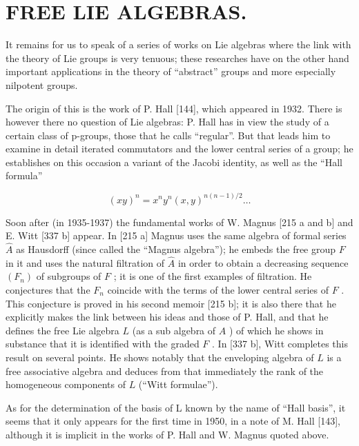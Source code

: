 \section{FREE LIE ALGEBRAS.}

It remains for us to speak of a series of works on Lie algebras where the link with the theory of Lie groups is very tenuous; these researches have on the other hand important applications in the theory of ``abstract'' groups and more especially nilpotent groups.

The origin of this is the work of P. Hall {[}144{]}, which appeared in 1932. There is however there no question of Lie algebras: P. Hall has in view the study of a certain class of p-groups, those that he calls ``regular''. But that leads him to examine in detail iterated commutators and the lower central series of a group; he establishes on this occasion a variant of the Jacobi identity, as well as the ``Hall formula''

\[
(x y) ^ {n} = x ^ {n} y ^ {n} (x, y) ^ {n (n - 1) / 2} \dots
\]

Soon after (in 1935-1937) the fundamental works of W. Magnus {[}215 a and b{]} and E. Witt {[}337 b{]} appear. In {[}215 a{]} Magnus uses the same algebra of formal series \(\hat{A}\) as Hausdorff (since called the ``Magnus algebra''); he embeds the free group \(F\) in it and uses the natural filtration of \(\hat{A}\) in order to obtain a decreasing sequence \((F_n)\) of subgroups of \(F\) ; it is one of the first examples of filtration. He conjectures that the \(F_n\) coincide with the terms of the lower central series of \(F\) . This conjecture is proved in his second memoir {[}215 b{]}; it is also there that he explicitly makes the link between his ideas and those of P. Hall, and that he defines the free Lie algebra \(L\) (as a sub algebra of \(A\) ) of which he shows in substance that it is identified with the graded \(F\) . In {[}337 b{]}, Witt completes this result on several points. He shows notably that the enveloping algebra of \(L\) is a free associative algebra and deduces from that immediately the rank of the homogeneous components of \(L\) (``Witt formulae'').

As for the determination of the basis of L known by the name of ``Hall basis'', it seems that it only appears for the first time in 1950, in a note of M. Hall {[}143{]}, although it is implicit in the works of P. Hall and W. Magnus quoted above.


